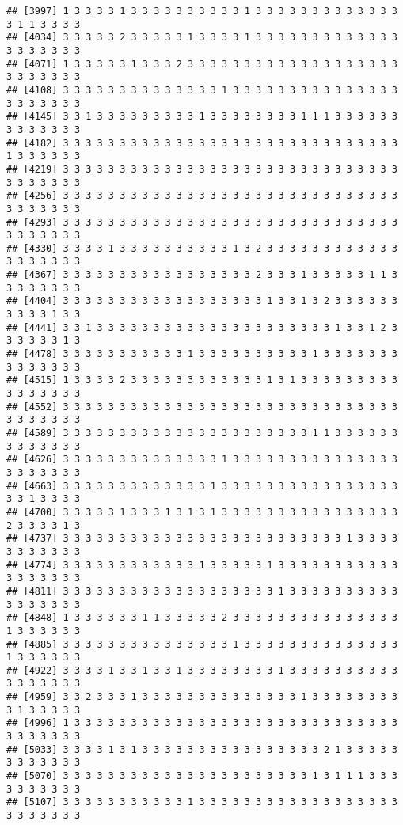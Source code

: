 \documentclass[
]{article}
\begin{document}
\begin{verbatim}
## [3997] 1 3 3 3 3 1 3 3 3 3 3 3 3 3 3 3 1 3 3 3 3 3 3 3 3 3 3 3 3 3 3 1 1 3 3 3 3
## [4034] 3 3 3 3 3 2 3 3 3 3 3 1 3 3 3 3 1 3 3 3 3 3 3 3 3 3 3 3 3 3 3 3 3 3 3 3 3
## [4071] 1 3 3 3 3 3 1 3 3 3 2 3 3 3 3 3 3 3 3 3 3 3 3 3 3 3 3 3 3 3 3 3 3 3 3 3 3
## [4108] 3 3 3 3 3 3 3 3 3 3 3 3 3 3 1 3 3 3 3 3 3 3 3 3 3 3 3 3 3 3 3 3 3 3 3 3 3
## [4145] 3 3 1 3 3 3 3 3 3 3 3 3 1 3 3 3 3 3 3 3 3 1 1 1 3 3 3 3 3 3 3 3 3 3 3 3 3
## [4182] 3 3 3 3 3 3 3 3 3 3 3 3 3 3 3 3 3 3 3 3 3 3 3 3 3 3 3 3 3 3 1 3 3 3 3 3 3
## [4219] 3 3 3 3 3 3 3 3 3 3 3 3 3 3 3 3 3 3 3 3 3 3 3 3 3 3 3 3 3 3 3 3 3 3 3 3 3
## [4256] 3 3 3 3 3 3 3 3 3 3 3 3 3 3 3 3 3 3 3 3 3 3 3 3 3 3 3 3 3 3 3 3 3 3 3 3 3
## [4293] 3 3 3 3 3 3 3 3 3 3 3 3 3 3 3 3 3 3 3 3 3 3 3 3 3 3 3 3 3 3 3 3 3 3 3 3 3
## [4330] 3 3 3 3 1 3 3 3 3 3 3 3 3 3 3 1 3 2 3 3 3 3 3 3 3 3 3 3 3 3 3 3 3 3 3 3 3
## [4367] 3 3 3 3 3 3 3 3 3 3 3 3 3 3 3 3 3 2 3 3 3 1 3 3 3 3 3 1 1 3 3 3 3 3 3 3 3
## [4404] 3 3 3 3 3 3 3 3 3 3 3 3 3 3 3 3 3 3 1 3 3 1 3 2 3 3 3 3 3 3 3 3 3 3 1 3 3
## [4441] 3 3 1 3 3 3 3 3 3 3 3 3 3 3 3 3 3 3 3 3 3 3 3 3 1 3 3 1 2 3 3 3 3 3 3 1 3
## [4478] 3 3 3 3 3 3 3 3 3 3 3 1 3 3 3 3 3 3 3 3 3 3 1 3 3 3 3 3 3 3 3 3 3 3 3 3 3
## [4515] 1 3 3 3 3 2 3 3 3 3 3 3 3 3 3 3 3 3 1 3 1 3 3 3 3 3 3 3 3 3 3 3 3 3 3 3 3
## [4552] 3 3 3 3 3 3 3 3 3 3 3 3 3 3 3 3 3 3 3 3 3 3 3 3 3 3 3 3 3 3 3 3 3 3 3 3 3
## [4589] 3 3 3 3 3 3 3 3 3 3 3 3 3 3 3 3 3 3 3 3 3 3 1 1 3 3 3 3 3 3 3 3 3 3 3 3 3
## [4626] 3 3 3 3 3 3 3 3 3 3 3 3 3 3 1 3 3 3 3 3 3 3 3 3 3 3 3 3 3 3 3 3 3 3 3 3 3
## [4663] 3 3 3 3 3 3 3 3 3 3 3 3 3 1 3 3 3 3 3 3 3 3 3 3 3 3 3 3 3 3 3 3 1 3 3 3 3
## [4700] 3 3 3 3 3 1 3 3 3 1 3 1 3 1 3 3 3 3 3 3 3 3 3 3 3 3 3 3 3 3 2 3 3 3 3 1 3
## [4737] 3 3 3 3 3 3 3 3 3 3 3 3 3 3 3 3 3 3 3 3 3 3 3 3 3 1 3 3 3 3 3 3 3 3 3 3 3
## [4774] 3 3 3 3 3 3 3 3 3 3 3 3 1 3 3 3 3 3 1 3 3 3 3 3 3 3 3 3 3 3 3 3 3 3 3 3 3
## [4811] 3 3 3 3 3 3 3 3 3 3 3 3 3 3 3 3 3 3 3 1 3 3 3 3 3 3 3 3 3 3 3 3 3 3 3 3 3
## [4848] 1 3 3 3 3 3 3 1 1 3 3 3 3 3 2 3 3 3 3 3 3 3 3 3 3 3 3 3 3 3 1 3 3 3 3 3 3
## [4885] 3 3 3 3 3 3 3 3 3 3 3 3 3 3 3 1 3 3 3 3 3 3 3 3 3 3 3 3 3 3 1 3 3 3 3 3 3
## [4922] 3 3 3 3 1 3 3 1 3 3 1 3 3 3 3 3 3 3 3 1 3 3 3 3 3 3 3 3 3 3 3 3 3 3 3 3 3
## [4959] 3 3 2 3 3 3 1 3 3 3 3 3 3 3 3 3 3 3 3 3 3 1 3 3 3 3 3 3 3 3 3 1 3 3 3 3 3
## [4996] 1 3 3 3 3 3 3 3 3 3 3 3 3 3 3 3 3 3 3 3 3 3 3 3 3 3 3 3 3 3 3 3 3 3 3 3 3
## [5033] 3 3 3 3 1 3 1 3 3 3 3 3 3 3 3 3 3 3 3 3 3 3 3 2 1 3 3 3 3 3 3 3 3 3 3 3 3
## [5070] 3 3 3 3 3 3 3 3 3 3 3 3 3 3 3 3 3 3 3 3 3 3 1 3 1 1 1 3 3 3 3 3 3 3 3 3 3
## [5107] 3 3 3 3 3 3 3 3 3 3 3 1 3 3 3 3 3 3 3 3 3 3 3 3 3 3 3 3 3 3 3 3 3 3 3 3 3

\end{verbatim}
\end{document}
